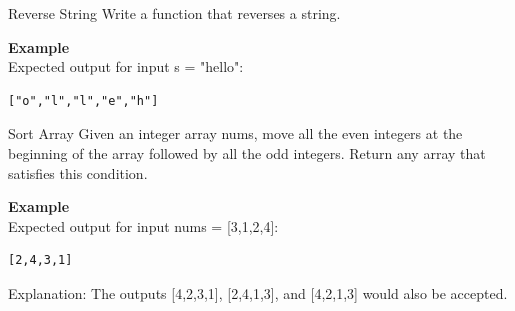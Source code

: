 \documentclass[twoside]{article}
\begin{document}
\begin{task}{Reverse String}{}{}
Write a function that reverses a string.

\vspace{10pt}
\textbf{Example}\\
Expected output for input s = "hello":
\begin{lstlisting}[numbers=none]
["o","l","l","e","h"]
\end{lstlisting}

\end{task}


\begin{task}{Sort Array}{}{}
Given an integer array nums, move all the even integers at the beginning of the array followed by all the odd integers.
Return any array that satisfies this condition.

\vspace{10pt}
\textbf{Example}\\
Expected output for input nums = [3,1,2,4]:
\begin{lstlisting}[numbers=none]
[2,4,3,1]
\end{lstlisting}
Explanation: The outputs [4,2,3,1], [2,4,1,3], and [4,2,1,3] would also be accepted.

\end{task}
\end{document}
